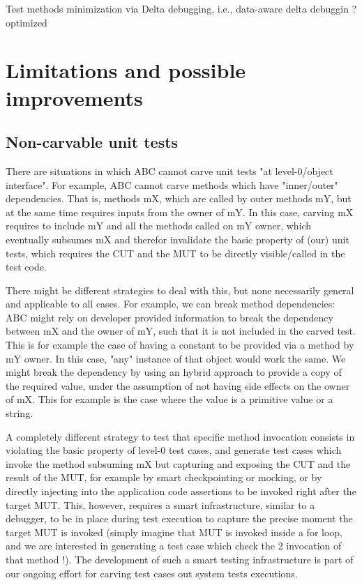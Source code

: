 \documentclass[10pt,conference]{IEEEtran}
\newcommand{\abc}{\textsf{ABC}\xspace}
\begin{document}
Test methods minimization via Delta debugging, i.e.,  data-aware delta debuggin ? optimized

\section{Limitations and possible improvements}

\subsection{Non-carvable unit tests}
There are situations in which \abc cannot carve unit tests "at level-0/object interface". For example, \abc cannot carve methods which have "inner/outer" dependencies. That is, methods mX, which are called by outer methods mY, but at the same time requires inputs from the owner of mY. In this case, carving mX requires to include mY and all the methods called on mY owner, which eventually subsumes mX and therefor invalidate the basic property of (our) unit tests, which requires the CUT and the MUT to be directly visible/called in the test code. 

There might be different strategies to deal with this, but none necessarily general and applicable to all cases.
For example, we can break method dependencies: \abc might rely on developer provided information to break the dependency between mX and the owner of mY, such that it is not included in the carved test. This is for example the case of having a constant to be provided via a method by mY owner. In this case, "any" instance of that object would work the same. We might break the dependency by using an hybrid approach to provide a copy of the required value, under the assumption of not having side effects on the owner of mX. This for example is the case where the value is a primitive value or a string. 

A completely different strategy to test that specific method invocation consists in violating the basic property of level-0 test cases, and generate test cases which invoke the method subsuming mX but capturing and exposing the CUT and the result of the MUT, for example by smart checkpointing or mocking, or by directly injecting into the application code assertions to be invoked right after the target MUT. This, however, requires a smart infrastructure, similar to a debugger, to be in place during test execution to capture the precise moment the target MUT is invoked (simply imagine that MUT is invoked inside a for loop, and we are interested in generating a test case which check the 2 invocation of that method !). The development of such a smart testing infrastructure is part of our ongoing effort for carving test cases out system tests executions. 
\end{document}
